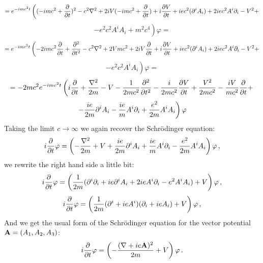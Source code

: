 \begin{equation*}
  =e^{-imc^2t}\left( (-imc^2+{\partial\over\partial t})^2 -c^2\nabla^2 +2iV(-imc^2+{\partial\over\partial t}) +i{\partial V\over\partial t} +iec^2(\partial^i A_i) +2iec^2A^i\partial_i -V^2+ \right.
\end{equation*}
\begin{equation*}
  \left. -e^2c^2A^iA_i +m^2c^4 \right)\varphi=
\end{equation*}
\begin{equation*}
  =e^{-imc^2t}\left( -2imc^2{\partial\over\partial t}+{\partial^2\over\partial t^2} -c^2\nabla^2 +2Vmc^2 +2iV{\partial\over\partial t} +i{\partial V\over\partial t} +iec^2(\partial^i A_i) +2iec^2A^i\partial_i -V^2+ \right.
\end{equation*}
\begin{equation*}
  \left. -e^2c^2A^iA_i \right)\varphi=
\end{equation*}
\begin{equation*}
  = -2mc^2 e^{-imc^2 t} \left(i{\partial\over\partial t}+{\nabla^2\over2m}-V -{1\over2mc^2}{\partial^2\over\partial t^2}-{i\over2mc^2}{\partial V\over\partial t}+{V^2\over2mc^2}-{iV\over mc^2}{\partial\over\partial t}+\right.
\end{equation*}
\begin{equation*}
  \left.-{ie\over2m}\partial^i A_i-{ie\over m}A^i\partial_i+{e^2\over2m}A^iA_i\right)\varphi
\end{equation*}
Taking the limit $c\to\infty$ we again recover the Schrödinger equation: 
\begin{equation*}
  i{\partial\over\partial t}\varphi=\left(-{\nabla^2\over2 m}+V +{ie\over2m}\partial^i A_i +{ie\over m}A^i\partial_i -{e^2\over2m}A^iA_i \right)\varphi\,,
\end{equation*}
we rewrite the right hand side a little bit: 
\begin{equation*}
  i{\partial\over\partial t}\varphi=\left({1\over2 m} (\partial^i\partial_i +ie\partial^i A_i +2ieA^i\partial_i -e^2A^iA_i ) +V \right)\varphi\,,
\end{equation*}
\begin{equation*}
  i{\partial\over\partial t}\varphi=\left({1\over2 m} (\partial^i+ieA^i)(\partial_i+ieA_i) +V \right)\varphi\,,
\end{equation*}
And we get the usual form of the Schrödinger equation for the vector potential ${\bf A}=(A_1, A_2, A_3)$: 
\begin{equation*}
  i{\partial\over\partial t}\varphi=\left(-{(\nabla+ie{\bf A})^2\over2 m} +V \right)\varphi\,.
\end{equation*}
